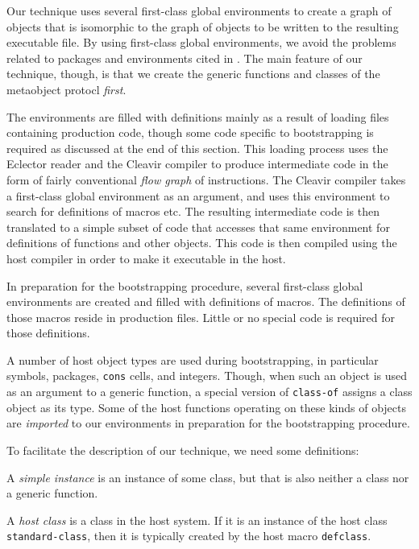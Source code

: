 Our technique uses several first-class global environments
\cite{Strandh:2015:ELS:Environments} to create a graph of objects that
is isomorphic to the graph of objects to be written to the resulting
executable file.  By using first-class global environments, we avoid
the problems related to packages and environments cited in
.  The main feature of our technique, though, is
that we create the generic functions and classes of the metaobject
protocl \emph{first}.

The environments are filled with definitions mainly as a result of
loading files containing production \sicl{} code, though some code
specific to bootstrapping is required as discussed at the end of this
section.  This loading process uses the Eclector reader and the
Cleavir compiler to produce intermediate code in the form of fairly
conventional \emph{flow graph} of instructions.  The Cleavir compiler
takes a first-class global environment as an argument, and uses this
environment to search for definitions of macros etc.  The resulting
intermediate code is then translated to a simple subset of
\commonlisp{} code that accesses that same environment for definitions
of functions and other objects.  This \commonlisp{} code is then
compiled using the host compiler in order to make it executable in the
host.

In preparation for the bootstrapping procedure, several first-class
global environments are created and filled with definitions of \sicl{}
macros.  The definitions of those macros reside in production \sicl{}
files.  Little or no special code is required for those definitions.

A number of host object types are used during bootstrapping, in
particular symbols, packages, \texttt{cons} cells, and integers.
Though, when such an object is used as an argument to a \sicl{}
generic function, a special version of \texttt{class-of} assigns a
\sicl{} class object as its type.  Some of the host functions
operating on these kinds of objects are \emph{imported} to our
environments in preparation for the bootstrapping procedure.

To facilitate the description of our technique, we need some
definitions:

\begin{definition}
A \emph{simple instance} is an instance of some class, but that is
also neither a class nor a generic function.
\end{definition}

\begin{definition}
A \emph{host class} is a class in the host system.  If it is an
instance of the host class \texttt{standard-class}, then it is
typically created by the host macro \texttt{defclass}.
\end{definition}

